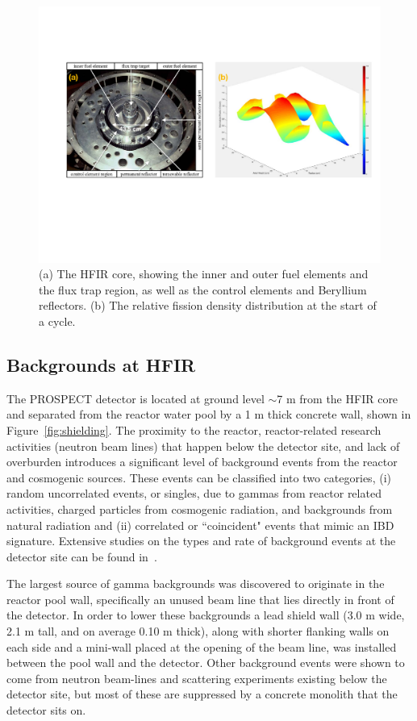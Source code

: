 \begin{figure}[t]
	\centering
	\includegraphics[width=0.9\linewidth]{tex/4-prospect-images/HFIR}
	\caption[The HFIR core and flux distribution]{(a) The HFIR core, showing the inner and outer fuel elements and the flux trap region, as well as the control elements and Beryllium reflectors. (b) The relative fission density distribution at the start of a cycle. \cite{HFIRTech}}
	\label{fig:hfir}
\end{figure}

\subsection{Backgrounds at HFIR}

The PROSPECT detector is located at ground level $\sim$7 m from the HFIR core and separated from the reactor water pool by a 1 m thick concrete wall, shown in Figure~\ref{fig:shielding}.
The proximity to the reactor, reactor-related research activities (neutron beam lines) that happen below the detector site, and lack of overburden introduces a significant level of background events from the reactor and cosmogenic sources. 
These events can be classified into two categories, (i) random uncorrelated events, or singles, due to gammas from reactor related activities, charged particles from cosmogenic radiation, and backgrounds from natural radiation and (ii) correlated or ``coincident" events that mimic an IBD signature.
Extensive studies on the types and rate of background events at the detector site can be found in~\cite{Ashenfelter:2015tpm,Heffron,Hackett}.

The largest source of gamma backgrounds was discovered to originate in the reactor pool wall, specifically an unused beam line that lies directly in front of the detector. 
In order to lower these backgrounds a lead shield wall (3.0 m wide, 2.1 m tall, and on average 0.10 m thick), along with shorter flanking walls on each side and a mini-wall placed at the opening of the beam line, was installed between the pool wall and the detector.
Other background events were shown to come from neutron beam-lines and scattering experiments existing below the detector site, but most of these are suppressed by a concrete monolith that the detector sits on.


